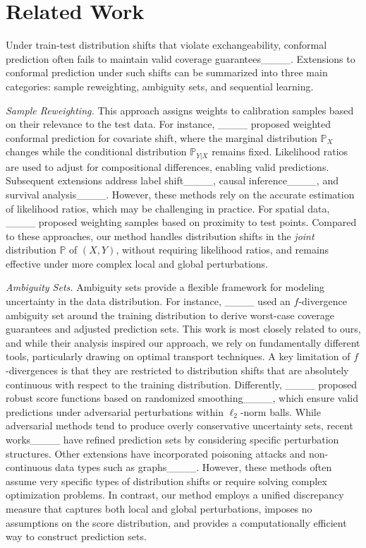 \section{Related Work}
\label{subsec:related:work}

Under train-test distribution shifts that violate exchangeability, conformal prediction often fails to maintain valid coverage guarantees____. Extensions to conformal prediction under such shifts can be summarized into three main categories: sample reweighting, ambiguity sets, and sequential learning.

\medskip

\noindent\emph{Sample Reweighting.} This approach assigns weights to calibration samples based on their relevance to the test data. For instance, ____ proposed weighted conformal prediction for covariate shift, where the marginal distribution $\mathbb P_X$ changes while the conditional distribution $\mathbb P_{Y|X}$ remains fixed. Likelihood ratios are used to adjust for compositional differences, enabling valid predictions. Subsequent extensions address label shift____, causal inference____, and survival analysis____. However, these methods rely on the accurate estimation of likelihood ratios, which may be challenging in practice. For spatial data, ____ proposed weighting samples based on proximity to test points. Compared to these approaches, our method handles distribution shifts in the \textit{joint} distribution $\mathbb P$ of $(X,Y)$, without requiring likelihood ratios, and remains effective under more complex local and global perturbations.

\medskip

\noindent\emph{Ambiguity Sets.} Ambiguity sets provide a flexible framework for modeling uncertainty in the data distribution. For instance, ____ used an $f$-divergence ambiguity set around the training distribution to derive worst-case coverage guarantees and adjusted prediction sets. This work is most closely related to ours, and while their analysis inspired our approach, we rely on fundamentally different tools, particularly drawing on optimal transport techniques. A key limitation of $f$-divergences is that they are restricted to distribution shifts that are absolutely continuous with respect to the training distribution. Differently, ____ proposed robust score functions based on randomized smoothing____, which ensure valid predictions under adversarial perturbations within $\ell_2$-norm balls. While adversarial methods tend to produce overly conservative uncertainty sets, recent works____ have refined prediction sets by considering specific perturbation structures. Other extensions have incorporated poisoning attacks and non-continuous data types such as graphs____. However, these methods often assume very specific types of distribution shifts or require solving complex optimization problems. In contrast, our method employs a unified discrepancy measure that captures both local and global perturbations, imposes no assumptions on the score distribution, and provides a computationally efficient way to construct prediction sets.

